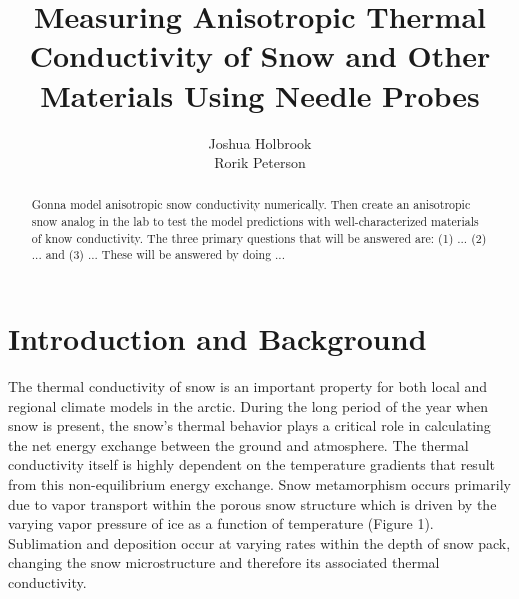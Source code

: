 \documentclass[12pt, letterpaper]{article}
\title{Measuring Anisotropic Thermal Conductivity of Snow and Other Materials Using Needle Probes}
\author{Joshua Holbrook \\ Rorik Peterson}
\begin{document}
\maketitle

\begin{abstract}
Gonna model anisotropic snow conductivity numerically. Then create an anisotropic snow analog in the lab to test the model predictions with well-characterized materials of know conductivity. The three primary questions that will be answered are: (1) ... (2) ... and (3) ... These will be answered by doing ...
\end{abstract}

\pagebreak

\section{Introduction and Background}

The thermal conductivity of snow is an important property for both local and regional climate models in the arctic. During the long period of the year when snow is present, the snow's thermal behavior plays a critical role in calculating the net energy exchange between the ground and atmosphere. The thermal conductivity itself is highly dependent on the temperature gradients that result from this non-equilibrium energy exchange. Snow metamorphism occurs primarily due to vapor transport within the porous snow structure which is driven by the varying vapor pressure of ice as a function of temperature (Figure 1). Sublimation and deposition occur at varying rates within the depth of snow pack, changing the snow microstructure and therefore its associated thermal conductivity.
\end{document}
